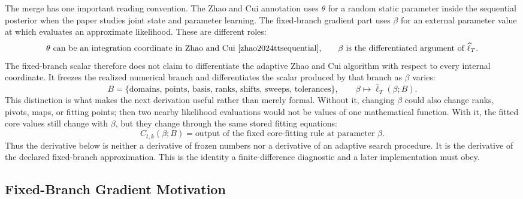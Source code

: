 \documentclass[11pt]{article}
\numberwithin{equation}{section}
\begin{document}
The merge has one important reading convention.  The Zhao and Cui \cite{zhao2024ttsequential} annotation uses
\(\theta\) for a random static parameter inside the sequential posterior when
the paper studies joint state and parameter learning.  The fixed-branch
gradient part uses \(\beta\) for an external parameter value at which
evaluates an approximate likelihood.  These are different roles:
\begin{equation}
    \theta \text{ can be an integration coordinate in Zhao and Cui \cite{zhao2024ttsequential},}
    \qquad
    \beta \text{ is the differentiated argument of } \widehat\ell_T .
    \label{eq:p24-p20-b1}
\end{equation}
The fixed-branch scalar therefore does not claim to differentiate the adaptive
Zhao and Cui \cite{zhao2024ttsequential} algorithm with respect to every internal coordinate.  It freezes the
realized numerical branch and differentiates the scalar produced by that
branch as \(\beta\) varies:
\begin{equation}
    B=\{\text{domains, points, basis, ranks, shifts, sweeps, tolerances}\},
    \qquad
    \beta\mapsto \widehat\ell_T(\beta;B).
    \label{eq:p24-p20-b2}
\end{equation}
This distinction is what makes the next derivation useful rather than merely
formal.  Without it, changing \(\beta\) could also change ranks, pivots, maps,
or fitting points; then two nearby likelihood evaluations would not be values
of one mathematical function.  With it, the fitted core values still change
with \(\beta\), but they change through the same stored fitting equations:
\begin{equation}
    C_{t,k}(\beta;B)
    =
    \text{output of the fixed core-fitting rule at parameter }\beta.
    \label{eq:p24-p20-b3}
\end{equation}
Thus the derivative below is neither a derivative of frozen numbers nor a
derivative of an adaptive search procedure.  It is the derivative of the
declared fixed-branch approximation.  This is the identity a finite-difference
diagnostic and a later implementation must obey.

\subsection{Fixed-Branch Gradient Motivation}
\end{document}
